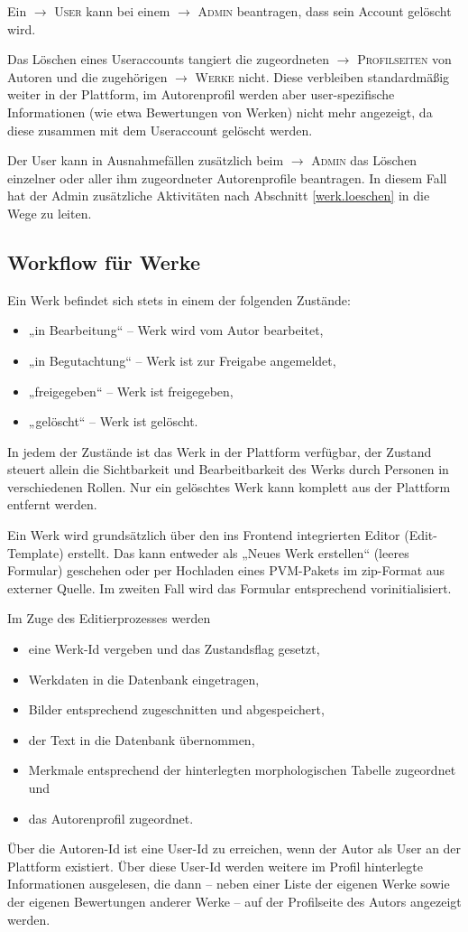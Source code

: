 \documentclass[a4paper,11pt]{article}
\newcommand{\glossar}[1]{{$\to$ \textsc{#1}}}
\begin{document}
Ein \glossar{User} kann bei einem \glossar{Admin} beantragen, dass sein Account
gelöscht wird.  

Das Löschen eines Useraccounts tangiert die zugeordneten
\glossar{Profilseiten} von Autoren und die zugehörigen \glossar{Werke} nicht.
Diese verbleiben standardmäßig weiter in der Plattform, im Autorenprofil
werden aber user-spezifische Informationen (wie etwa Bewertungen von Werken)
nicht mehr angezeigt, da diese zusammen mit dem Useraccount gelöscht werden.

Der User kann in Ausnahmefällen zusätzlich beim \glossar{Admin} das Löschen
einzelner oder aller ihm zugeordneter Autorenprofile beantragen. In diesem
Fall hat der Admin zusätzliche Aktivitäten nach Abschnitt \ref{werk.loeschen}
in die Wege zu leiten.

\subsection{Workflow für Werke}

Ein Werk befindet sich stets in einem der folgenden Zustände:
\begin{itemize}\itemsep0pt
\item „in Bearbeitung“ -- Werk wird vom Autor bearbeitet,
\item „in Begutachtung“ -- Werk ist zur Freigabe angemeldet,
\item „freigegeben“ -- Werk ist freigegeben,
\item „gelöscht“ -- Werk ist gelöscht.
\end{itemize}
In jedem der Zustände ist das Werk in der Plattform verfügbar, der Zustand
steuert allein die Sichtbarkeit und Bearbeitbarkeit des Werks durch Personen
in verschiedenen Rollen. Nur ein gelöschtes Werk kann komplett aus der
Plattform entfernt werden.

Ein Werk wird grundsätzlich über den ins Frontend integrierten Editor
(Edit-Template) erstellt. Das kann entweder als „Neues Werk erstellen“ (leeres
Formular) geschehen oder per Hochladen eines PVM-Pakets im zip-Format aus
externer Quelle. Im zweiten Fall wird das Formular entsprechend
vorinitialisiert. 

Im Zuge des Editierprozesses werden
\begin{itemize}\itemsep0pt
\item eine Werk-Id vergeben und das Zustandsflag gesetzt,
\item Werkdaten in die Datenbank eingetragen,
\item Bilder entsprechend zugeschnitten und abgespeichert,
\item der Text in die Datenbank übernommen,
\item Merkmale entsprechend der hinterlegten morphologischen Tabelle
  zugeordnet und
\item das Autorenprofil zugeordnet.
\end{itemize}
Über die Autoren-Id ist eine User-Id zu erreichen, wenn der Autor als User an
der Plattform existiert. Über diese User-Id werden weitere im Profil
hinterlegte Informationen ausgelesen, die dann -- neben einer Liste der eigenen
Werke sowie der eigenen Bewertungen anderer Werke -- auf der Profilseite des
Autors angezeigt werden.
\end{document}
